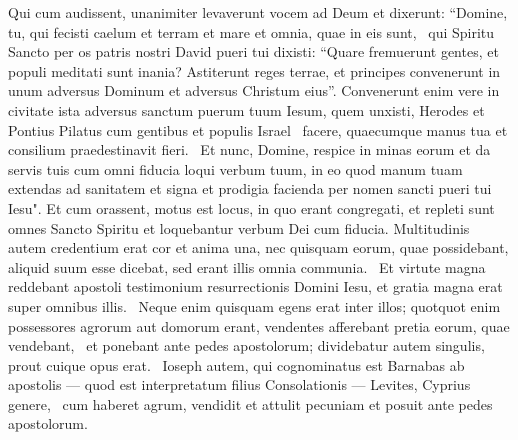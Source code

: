 \begin{biblechapter}
\verse Qui cum audissent, unanimiter levaverunt vocem ad Deum et dixerunt: “Domine, tu, qui fecisti caelum et terram et mare et omnia, quae in eis sunt,  
\verse qui Spiritu Sancto per os patris nostri David pueri tui dixisti: “Quare fremuerunt gentes, et populi meditati sunt inania? 
\verse Astiterunt reges terrae, et principes convenerunt in unum adversus Dominum et adversus Christum eius”. 
\verse Convenerunt enim vere in civitate ista adversus sanctum puerum tuum Iesum, quem unxisti, Herodes et Pontius Pilatus cum gentibus et populis Israel  
\verse facere, quaecumque manus tua et consilium praedestinavit fieri.  
\verse Et nunc, Domine, respice in minas eorum et da servis tuis cum omni fiducia loqui verbum tuum, 
\verse in eo quod manum tuam extendas ad sanitatem et signa et prodigia facienda per nomen sancti pueri tui Iesu". 
\verse Et cum orassent, motus est locus, in quo erant congregati, et repleti sunt omnes Sancto Spiritu et loquebantur verbum Dei cum fiducia. 
\verse Multitudinis autem credentium erat cor et anima una, nec quisquam eorum, quae possidebant, aliquid suum esse dicebat, sed erant illis omnia communia.  
\verse Et virtute magna reddebant apostoli testimonium resurrectionis Domini Iesu, et gratia magna erat super omnibus illis.  
\verse Neque enim quisquam egens erat inter illos; quotquot enim possessores agrorum aut domorum erant, vendentes afferebant pretia eorum, quae vendebant,  
\verse et ponebant ante pedes apostolorum; dividebatur autem singulis, prout cuique opus erat.  
\verse Ioseph autem, qui cognominatus est Barnabas ab apostolis — quod est interpretatum filius Consolationis — Levites, Cyprius genere, 
\verse cum haberet agrum, vendidit et attulit pecuniam et posuit ante pedes apostolorum. 
\end{biblechapter}


